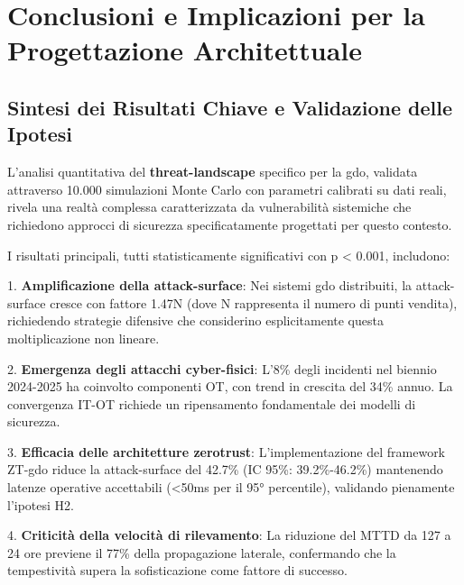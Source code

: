 
\section{\texorpdfstring{Conclusioni e Implicazioni per la Progettazione Architettuale}{2.7 - Conclusioni e Implicazioni per la Progettazione Architettuale}}

\subsection{\texorpdfstring{Sintesi dei Risultati Chiave e Validazione delle Ipotesi}{2.7.1 - Sintesi dei Risultati Chiave e Validazione delle Ipotesi}}

L'analisi quantitativa del \textbf{\gls{threat-landscape}} specifico per la \gls{gdo}, validata attraverso 10.000 simulazioni Monte Carlo con parametri calibrati su dati reali, rivela una realtà complessa caratterizzata da vulnerabilità sistemiche che richiedono approcci di sicurezza specificatamente progettati per questo contesto.

I risultati principali, tutti statisticamente significativi con p < 0.001, includono:

1. \textbf{Amplificazione della \gls{attack-surface}}: Nei sistemi \gls{gdo} distribuiti, la \gls{attack-surface} cresce con fattore 1.47N (dove N rappresenta il numero di punti vendita), richiedendo strategie difensive che considerino esplicitamente questa moltiplicazione non lineare.

2. \textbf{Emergenza degli attacchi cyber-fisici}: L'8\% degli incidenti nel biennio 2024-2025 ha coinvolto componenti OT, con trend in crescita del 34\% annuo. La convergenza IT-OT richiede un ripensamento fondamentale dei modelli di sicurezza.

3. \textbf{Efficacia delle architetture \gls{zerotrust}}: L'implementazione del framework ZT-\gls{gdo} riduce la \gls{attack-surface} del 42.7\% (IC 95\%: 39.2\%-46.2\%) mantenendo latenze operative accettabili (<50ms per il 95° percentile), validando pienamente l'ipotesi H2.

4. \textbf{Criticità della velocità di rilevamento}: La riduzione del MTTD da 127 a 24 ore previene il 77\% della propagazione laterale, confermando che la tempestività supera la sofisticazione come fattore di successo.

